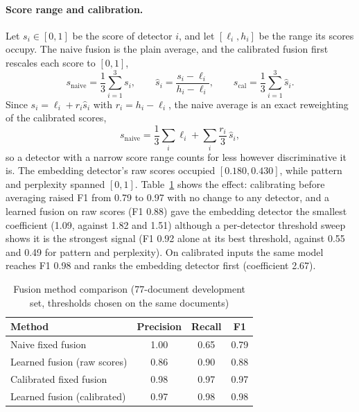 \paragraph{Score range and calibration.}
Let $s_i\in[0,1]$ be the score of detector $i$, and let $[\ell_i,h_i]$ be the
range its scores occupy. The naive fusion is the plain average, and the
calibrated fusion first rescales each score to $[0,1]$,
\begin{equation}
    s_{\text{naive}}=\frac13\sum_{i=1}^{3}s_i,\qquad
    \hat s_i=\frac{s_i-\ell_i}{h_i-\ell_i},\qquad
    s_{\text{cal}}=\frac13\sum_{i=1}^{3}\hat s_i .
    \label{eq:calibration}
\end{equation}
Since $s_i=\ell_i+r_i\hat s_i$ with $r_i=h_i-\ell_i$, the naive average is an
exact reweighting of the calibrated scores,
\begin{equation}
    s_{\text{naive}}=\frac13\sum_{i}\ell_i+\sum_{i}\frac{r_i}{3}\,\hat s_i ,
    \label{eq:reweight}
\end{equation}
so a detector with a narrow score range counts for less however discriminative it
is. The embedding detector's raw scores occupied $[0.180,0.430]$, while pattern
and perplexity spanned $[0,1]$. Table~\ref{tab:fusion} shows the effect: calibrating
before averaging raised F1 from 0.79 to 0.97 with no change to any detector, and a
learned fusion on raw scores (F1 0.88) gave the embedding detector the smallest
coefficient (1.09, against 1.82 and 1.51) although a per-detector threshold sweep
shows it is the strongest signal (F1 0.92 alone at its best threshold, against
0.55 and 0.49 for pattern and perplexity). On calibrated inputs the same model
reaches F1 0.98 and ranks the embedding detector first (coefficient 2.67).

\begin{table}[t]
\caption{Fusion method comparison (77-document development set, thresholds chosen on the same documents)}
\label{tab:fusion}
\centering
\begin{tabular}{@{}lccc@{}}
\toprule
Method & Precision & Recall & F1 \\
\midrule
Naive fixed fusion & 1.00 & 0.65 & 0.79 \\
Learned fusion (raw scores) & 0.86 & 0.90 & 0.88 \\
Calibrated fixed fusion & 0.98 & 0.97 & 0.97 \\
Learned fusion (calibrated) & 0.97 & 0.98 & 0.98 \\
\bottomrule
\end{tabular}
\end{table}

